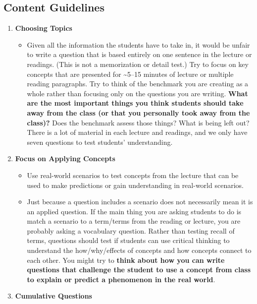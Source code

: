 \documentclass[
]{article}
\providecommand{\tightlist}{%
  \setlength{\itemsep}{0pt}\setlength{\parskip}{0pt}}
\begin{document}
\hypertarget{content-guidelines}{%
\subsection{Content Guidelines}\label{content-guidelines}}

\begin{enumerate}
\def\labelenumi{\arabic{enumi}.}
\tightlist
\item
  \textbf{Choosing Topics}

  \begin{itemize}
  \tightlist
  \item
    Given all the information the students have to take in, it would be unfair to write a question that is based entirely on one sentence in the lecture or readings. (This is not a memorization or detail test.) Try to focus on key concepts that are presented for \textasciitilde5--15 minutes of lecture or multiple reading paragraphs. Try to think of the benchmark you are creating as a whole rather than focusing only on the questions you are writing. \textbf{What are the most important things you think students should take away from the class (or that you personally took away from the class)?} Does the benchmark assess those things? What is being left out? There is a lot of material in each lecture and readings, and we only have seven questions to test students' understanding.
  \end{itemize}
\item
  \textbf{Focus on Applying Concepts}

  \begin{itemize}
  \tightlist
  \item
    Use real-world scenarios to test concepts from the lecture that can be used to make predictions or gain understanding in real-world scenarios.
  \item
    Just because a question includes a scenario does not necessarily mean it is an applied question. If the main thing you are asking students to do is match a scenario to a term/terms from the reading or lecture, you are probably asking a vocabulary question. Rather than testing recall of terms, questions should test if students can use critical thinking to understand the how/why/effects of concepts and how concepts connect to each other. You might try to \textbf{think about how you can write questions that challenge the student to use a concept from class to explain or predict a phenomenon in the real world}.
  \end{itemize}
\item
  \textbf{Cumulative Questions}


\end{enumerate}
\end{document}
